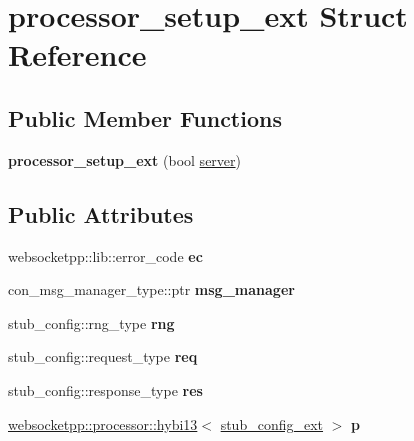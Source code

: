 \hypertarget{structprocessor__setup__ext}{}\section{processor\+\_\+setup\+\_\+ext Struct Reference}
\label{structprocessor__setup__ext}
\subsection*{Public Member Functions}
\begin{DoxyCompactItemize}
\item 
{\bfseries processor\+\_\+setup\+\_\+ext} (bool \hyperlink{classwebsocketpp_1_1server}{server})\hypertarget{structprocessor__setup__ext_a7be679fcc1767117e9040bce609e59ab}{}\label{structprocessor__setup__ext_a7be679fcc1767117e9040bce609e59ab}

\end{DoxyCompactItemize}
\subsection*{Public Attributes}
\begin{DoxyCompactItemize}
\item 
websocketpp\+::lib\+::error\+\_\+code {\bfseries ec}\hypertarget{structprocessor__setup__ext_a500a49844ae879bb8189a58e89005cfa}{}\label{structprocessor__setup__ext_a500a49844ae879bb8189a58e89005cfa}

\item 
con\+\_\+msg\+\_\+manager\+\_\+type\+::ptr {\bfseries msg\+\_\+manager}\hypertarget{structprocessor__setup__ext_a28f7642ffd000c87b1f6e1636fa89858}{}\label{structprocessor__setup__ext_a28f7642ffd000c87b1f6e1636fa89858}

\item 
stub\+\_\+config\+::rng\+\_\+type {\bfseries rng}\hypertarget{structprocessor__setup__ext_a320e92e2721ed24ee02f04c103b78428}{}\label{structprocessor__setup__ext_a320e92e2721ed24ee02f04c103b78428}

\item 
stub\+\_\+config\+::request\+\_\+type {\bfseries req}\hypertarget{structprocessor__setup__ext_a3407743ef41e1a27cf5da82d467777d0}{}\label{structprocessor__setup__ext_a3407743ef41e1a27cf5da82d467777d0}

\item 
stub\+\_\+config\+::response\+\_\+type {\bfseries res}\hypertarget{structprocessor__setup__ext_a92adbb5666a2e60851507757f1f36443}{}\label{structprocessor__setup__ext_a92adbb5666a2e60851507757f1f36443}

\item 
\hyperlink{classwebsocketpp_1_1processor_1_1hybi13}{websocketpp\+::processor\+::hybi13}$<$ \hyperlink{structstub__config__ext}{stub\+\_\+config\+\_\+ext} $>$ {\bfseries p}\hypertarget{structprocessor__setup__ext_a04ff04a58e537a96fc110d36928f828b}{}\label{structprocessor__setup__ext_a04ff04a58e537a96fc110d36928f828b}

\end{DoxyCompactItemize}


